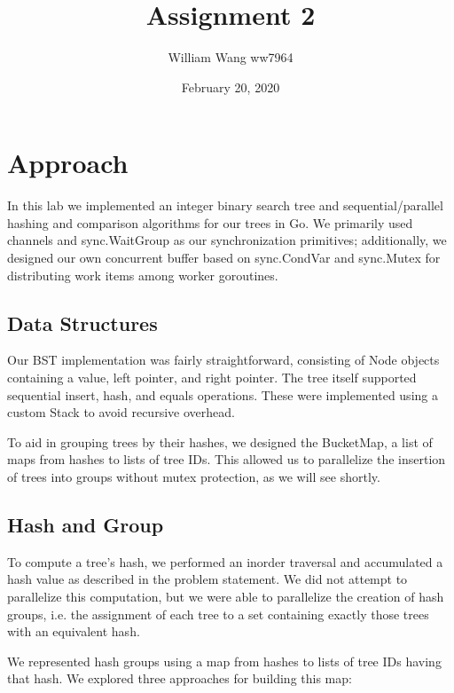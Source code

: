 \documentclass[11pt]{article}
\title{Assignment 2}
\author{William Wang ww7964}
\date{February 20, 2020}
\begin{document}
\maketitle

\section{Approach}
In this lab we implemented an integer binary search tree and sequential/parallel hashing and comparison algorithms for our trees in Go. We primarily used channels and sync.WaitGroup as our synchronization primitives; additionally, we designed our own concurrent buffer based on sync.CondVar and sync.Mutex for distributing work items among worker goroutines.

\subsection{Data Structures}
Our BST implementation was fairly straightforward, consisting of Node objects containing a value, left pointer, and right pointer. The tree itself supported sequential insert, hash, and equals operations. These were implemented using a custom Stack to avoid recursive overhead.

To aid in grouping trees by their hashes, we designed the BucketMap, a list of maps from hashes to lists of tree IDs. This allowed us to parallelize the insertion of trees into groups without mutex protection, as we will see shortly.

\subsection{Hash and Group}
To compute a tree's hash, we performed an inorder traversal and accumulated a hash value as described in the problem statement. We did not attempt to parallelize this computation, but we were able to parallelize the creation of hash groups, i.e. the assignment of each tree to a set containing exactly those trees with an equivalent hash.

We represented hash groups using a map from hashes to lists of tree IDs having that hash. We explored three approaches for building this map:
\end{document}

